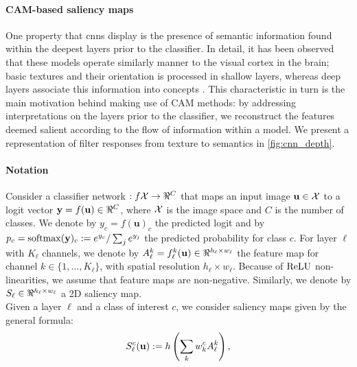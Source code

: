 \paragraph{CAM-based saliency maps}
One property that \glspl{cnn} display is the presence of semantic information found within the 
deepest layers prior to the classifier. In detail, it has been observed that these models 
operate similarly manner to the visual cortex in the brain; basic textures and their orientation 
is processed in shallow layers, whereas deep layers associate this information into concepts 
\autocite{hubel1959receptive}. This characteristic in turn is the main motivation behind making 
use of CAM methods: by addressing interpretations on the layers prior to the classifier, we 
reconstruct the features deemed salient according to the flow of information within a model. We 
present a representation of filter responses from texture to semantics in \autoref{fig:cnn_depth}.

\paragraph{Notation}
\label{sec:oc_notation}
Consider a classifier network $:f \cX \to \real^C$ that maps an input image $\mathbf{u} \in \mathcal{X}$ to a 
logit vector $\vy = f(\mathbf{u}) \in \real^C$, where $\mathcal{X}$ is the image space and $C$ is the number 
of classes. We denote by $y_c = f(\mathbf{u})_c$ the predicted logit and by $p_c = \operatorname{softmax}(\mathbf{y})_c 
\mathrel{:=} e^{y_c} / \sum_j e^{y_j}$ the predicted probability for class $c$. For layer $\ell$ 
with $K_\ell$ channels, we denote by $A^k_\ell = f^k_\ell(\mathbf{u}) \in \real^{h_\ell \times w_\ell}$ 
the feature map for channel $k \in \{1,\dots,K_\ell\}$, with spatial resolution $h_\ell \times 
w_\ell$. Because of ${\operatorname{ReLU}}$ non-linearities, we assume that feature maps are non-negative. 
Similarly, we denote by $S_\ell \in \real^{h_\ell \times w_\ell}$ a 2D saliency map.\\

\label{sec:oc_back}
\noindent Given a layer $\ell$ and a class of interest $c$, we consider saliency maps given by the 
general formula: \\

\begin{equation}
	S^c_\ell(\mathbf{u}) \mathrel{:=} h \left( \sum_k w^c_k A^k_\ell \right),
\label{eq:sal}
\end{equation}


